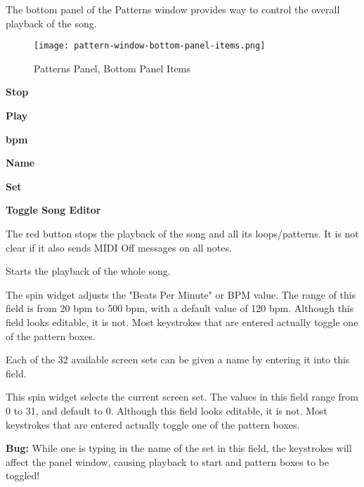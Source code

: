    The bottom panel of the Patterns window provides way to control the
   overall playback of the song.

\begin{figure}[H]
   \centering 
   \texttt{[image: pattern-window-bottom-panel-items.png]}
   \caption{Patterns Panel, Bottom Panel Items}
   \label{fig:pattern_window_bottom_panel_items}
\end{figure}

   \begin{enumber}
      \item \textbf{Stop}
      \item \textbf{Play}
      \item \textbf{bpm}
      \item \textbf{Name}
      \item \textbf{Set}
      \item \textbf{Toggle Song Editor}
   \end{enumber}

   \setcounter{ItemCounter}{0}      %

   The red button stops the playback of the song and all its loops/patterns.
   It is not clear if it also sends MIDI Off messages on all notes.

   Starts the playback of the whole song.

   The spin widget adjusts the "Beats Per Minute" or BPM value.  The
   range of this field is from 20 bpm to 500 bpm, with a default value of
   120 bpm.
   Although this field looks editable, it is not.  Most keystrokes
   that are entered actually toggle one of the pattern boxes.

   Each of the 32 available screen sets can be given a name by entering it
   into this field.

   This spin widget selects the current screen set.  The values in this
   field range from 0 to 31, and default to 0.
   Although this field looks editable, it is not.  Most keystrokes
   that are entered actually toggle one of the pattern boxes.

   \textbf{Bug:}
   While one is typing in the name of the set in this field, the keystrokes
   will affect the panel window, causing playback to start and pattern
   boxes to be toggled!


